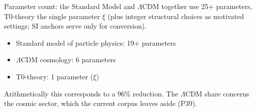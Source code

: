 	\begin{revolutionary}
		Parameter count: the Standard Model and $\Lambda$CDM together use 25+ parameters, T0-theory the single parameter $\xi$ (plus integer structural choices as motivated settings; SI anchors serve only for conversion).
		\begin{itemize}
			\item Standard model of particle physics: 19+ parameters
			\item $\Lambda$CDM cosmology: 6 parameters
			\item T0-theory: 1 parameter ($\xi$)
		\end{itemize}
		Arithmetically this corresponds to a 96\% reduction. The $\Lambda$CDM share concerns the cosmic sector, which the current corpus leaves aside (P39).
	\end{revolutionary}
	
